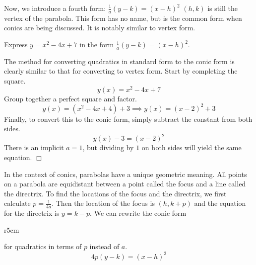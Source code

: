 \documentclass[../book.tex]{subfiles}
\begin{document}
\noindent Now, we introduce a fourth form: $ \frac{1}{a}(y-k) = (x-h)^2$
$(h,k)$ is still the vertex of the parabola.  This form has no name, but is the common form when conics are being discussed.  It is notably similar to vertex form.

\begin{example}
Express $y = x^2-4x+7$ in the form $\frac{1}{a}(y-k)=(x-h)^2$.
\end{example}
\begin{solution}
The method for converting quadratics in standard form to the conic form is clearly similar to that for converting to vertex form.  Start by completing the square.
$$y(x) = x^2 - 4x + 7 $$
Group together a perfect square and factor.
$$y(x) = (x^2 - 4x + 4) + 3 \implies y(x) = (x-2)^2+3 $$
Finally, to convert this to the conic form, simply subtract the constant from both sides.
$$y(x) - 3 = (x-2)^2 $$
There is an implicit $a=1$, but dividing by $1$ on both sides will yield the same equation. $\Box$
\end{solution}
In the context of conics, parabolas have a unique geometric meaning.  All points on a parabola are equidistant between a point called the focus and a line called the directrix.  To find the locations of the focus and the directrix, we first calculate $p = \frac{1}{4a}$.  Then the location of the focus is $(h,k+p)$ and the equation for the directrix is $y = k-p$.  We can rewrite the conic form 

\begin{wrapfigure}{r}{5cm}
\end{wrapfigure}

\noindent for quadratics in terms of $p$ instead of $a$.
$$4p(y-k) = (x-h)^2 $$
\end{document}
